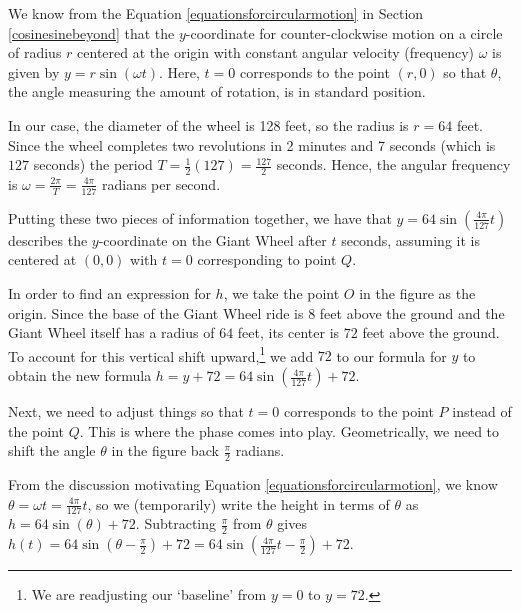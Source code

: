 \documentclass{ximera}
\begin{document}
\begin{example}
\begin{explanation}
We know from the Equation \ref{equationsforcircularmotion} in Section \ref{cosinesinebeyond} that the $y$-coordinate for counter-clockwise motion on a circle of radius $r$ centered at the origin with constant angular velocity (frequency) $\omega$ is given by $y = r\sin(\omega t)$.  Here,  $t=0$ corresponds to the point $(r,0)$ so that $\theta$, the angle measuring the amount of rotation, is in standard position. 



In our case, the diameter of the wheel is 128 feet, so the radius is $r = 64$ feet. Since the wheel completes two revolutions in 2 minutes and 7 seconds (which is $127$ seconds) the period $T = \frac{1}{2} (127) = \frac{127}{2}$ seconds.  Hence, the angular frequency is $\omega = \frac{2\pi}{T} = \frac{4 \pi}{127}$ radians per second.  



Putting these two pieces of information together, we have that  $y = 64 \sin\left(\frac{4 \pi}{127} t\right)$ describes the $y$-coordinate on the Giant Wheel after $t$ seconds, assuming it is centered at $(0,0)$ with $t=0$ corresponding to point $Q$. 



 In order to find an expression for $h$, we take the point $O$ in the figure as the origin.    Since the base of the Giant Wheel ride is $8$ feet above the ground and the Giant Wheel itself has a radius of  $64$ feet, its center is $72$ feet above the ground. To account for this vertical shift upward,\footnote{We are readjusting our `baseline' from $y=0$ to $y=72$.} we add $72$ to our formula for $y$ to obtain the new formula $h = y  + 72 = 64 \sin\left(\frac{4 \pi}{127} t\right) + 72$.  
 
 
 
 Next, we need to adjust things so that $t=0$ corresponds to the point $P$ instead of the point $Q$. This is where the phase comes into play.  Geometrically, we need to shift the angle $\theta$ in the figure back $\frac{\pi}{2}$ radians.  
 
 
 
 From the discussion motivating Equation \ref{equationsforcircularmotion},  we know $\theta = \omega t = \frac{4 \pi}{127} t$, so we (temporarily) write the height in terms of $\theta$ as  $h =64 \sin\left(\theta\right) + 72$.    Subtracting $\frac{\pi}{2}$ from $\theta$ gives $h(t) = 64 \sin\left(\theta - \frac{\pi}{2}\right) + 72 = 64\sin\left(\frac{4 \pi}{127} t -\frac{\pi}{2} \right) + 72$. 
 


\end{explanation}
\end{example}
\end{document}
